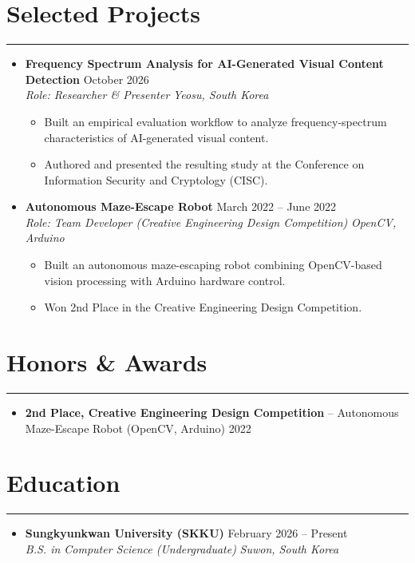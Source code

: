 \documentclass[letterpaper, 10pt]{article}
\begin{document}
\section*{Selected Projects}
\hrule
\vspace{4pt}
\begin{itemize}
\item[]
\textbf{Frequency Spectrum Analysis for AI-Generated Visual Content Detection} \hfill October 2026 \\
\textit{Role: Researcher \& Presenter} \hfill \textit{Yeosu, South Korea}
\begin{itemize}
\item Built an empirical evaluation workflow to analyze frequency-spectrum characteristics of AI-generated visual content.
\item Authored and presented the resulting study at the Conference on Information Security and Cryptology (CISC).
\end{itemize}
\item[]
\textbf{Autonomous Maze-Escape Robot} \hfill March 2022 -- June 2022 \\
\textit{Role: Team Developer (Creative Engineering Design Competition)} \hfill \textit{OpenCV, Arduino}
\begin{itemize}
\item Built an autonomous maze-escaping robot combining OpenCV-based vision processing with Arduino hardware control.
\item Won 2nd Place in the Creative Engineering Design Competition.
\end{itemize}
\end{itemize}
\section*{Honors \& Awards}
\hrule
\vspace{4pt}
\begin{itemize}
\item \textbf{2nd Place, Creative Engineering Design Competition} -- Autonomous Maze-Escape Robot (OpenCV, Arduino) \hfill 2022
\end{itemize}
\section*{Education}
\hrule
\vspace{4pt}
\begin{itemize}
\item[]
\textbf{Sungkyunkwan University (SKKU)} \hfill February 2026 -- Present \\
\textit{B.S. in Computer Science (Undergraduate)} \hfill \textit{Suwon, South Korea}
\end{itemize}
\end{document}

